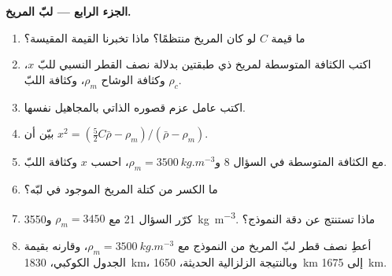 \begin{problem}
\medskip
\noindent\textbf{الجزء الرابع --- لبّ المريخ.}
\begin{enumerate}[resume]
  \item ما قيمة $C$ لو كان المريخ منتظمًا؟ ماذا تخبرنا القيمة المقيسة؟
  \item اكتب الكثافة المتوسطة لمريخ ذي طبقتين بدلالة نصف القطر النسبي للبّ $x$، وكثافة الوشاح $\rho_m$، وكثافة اللبّ $\rho_c$.
  \item اكتب عامل عزم قصوره الذاتي بالمجاهيل نفسها.
  \item بيّن أن $x^2 = (\tfrac52C\bar\rho - \rho_m)/(\bar\rho - \rho_m)$.
  \item مع الكثافة المتوسطة في السؤال 8 و$\rho_m =
        \qty{3500}{kg.m^{-3}}$، احسب $x$ وكثافة اللبّ.
  \item ما الكسر من كتلة المريخ الموجود في لبّه؟
  \item كرّر السؤال 21 مع $\rho_m = 3450$ و\qty{3550}{kg.m^{-3}}. ماذا تستنتج عن دقة النموذج؟
  \item أعطِ نصف قطر لبّ المريخ من النموذج مع $\rho_m = \qty{3500}{kg.m^{-3}}$، وقارنه بقيمة الجدول الكوكبي، \qty{1830}{km}، وبالنتيجة الزلزالية الحديثة، \qty{1650}{km} إلى \qty{1675}{km}.
\end{enumerate}
\end{problem}
